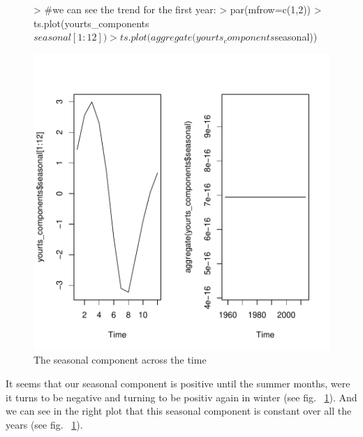 \documentclass[11pt, a4paper]{article} %
\begin{document}
\begin{Schunk}
\end{Schunk}
\begin{figure}[H]
\centering
\begin{Schunk}
\begin{Sinput}
> #we can see the trend for the first year:
> par(mfrow=c(1,2))
> ts.plot(yourts_components$seasonal[1:12])
> ts.plot(aggregate(yourts_components$seasonal))
\end{Sinput}
\end{Schunk}
\includegraphics{alleselena-decomposition}
\caption{The seasonal component across the time}
\label{decomposition}
\end{figure}
It seems that our seasonal component is positive until the summer months, were it turns to be negative and turning to be positiv again in winter (see fig. ~\ref{decomposition}). And we can see in the right plot that this seasonal component is constant over all the years (see fig. ~\ref{decomposition}).
\end{document}
